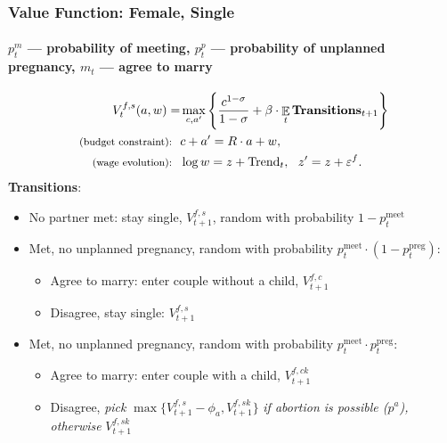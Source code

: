 \documentclass[aspectratio=169]{beamer}
\DeclareMathOperator{\E}{\mathbb{E}}
\let\olditem\item
\renewcommand{\item}{%
\olditem\vspace{\fill}}
\begin{document}
\begin{frame}
\begin{center}
\end{center}
\end{frame}


\begin{frame}
\frametitle{Value Function: Female, Single}
\framesubtitle{$p^m_t$ --- probability of meeting, $p^p_t$ --- probability of unplanned pregnancy, $m_t$ --- agree to marry}
\begin{align*}
V^{f,s}_t(a,w) = & \max\limits_{c,a'} \Bigg\{ \frac{c^{1-\sigma}}{1-\sigma} + \beta \cdot \E_t  \text{\textbf{Transitions}}_{t+1} \Bigg\}  \\
\text{ \footnotesize (budget constraint): \ } & c + a' = R\cdot a  + w , \\
\text{ \footnotesize (wage evolution): \ } & \log w = z + \text{Trend}_t, \ \ z' = z + \varepsilon^{f}.
\end{align*}
\textbf{Transitions}:
\begin{itemize}
\item \footnotesize No partner met: stay single, $V^{f,s}_{t+1}$, random with probability $1-p^{\text{meet}}_t$
\item \footnotesize Met, no unplanned pregnancy, random with probability $p^{\text{meet}}_t\cdot (1-p^{\text{preg}}_t)$: 
\begin{itemize}
\item \footnotesize Agree to marry: enter couple without a child, $V^{f,c}_{t+1}$
\item\footnotesize  Disagree, stay single: $V^{f,s}_{t+1}$
\end{itemize}
\item \footnotesize Met, no unplanned pregnancy, random with probability $p^{\text{meet}}_t\cdot p^{\text{preg}}_t$: 
\begin{itemize}
\item \footnotesize Agree to marry: enter couple with a child, $V^{f,ck}_{t+1}$
\item \footnotesize Disagree, \textit{pick} $\max\{V^{f,s}_{t+1} - \phi_a, V^{f,sk}_{t+1}\}$ \textit{if abortion is possible ($p^a$), otherwise} $V^{f,sk}_{t+1}$
\end{itemize}
\end{itemize}
\end{frame}
\end{document}
